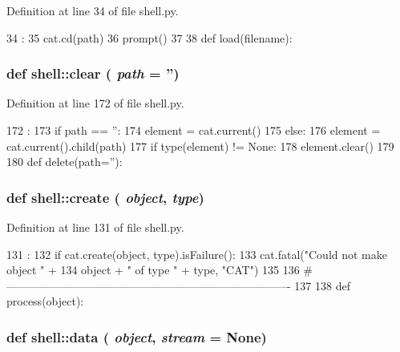 Definition at line 34 of file shell.py.


\begin{DoxyCode}
34                :
35   cat.cd(path)
36   prompt()
37 
38 
def load(filename):
\end{DoxyCode}
\hypertarget{namespaceshell_aeef375fe6412bd4da281ceaac2fad6b0}{
\subsubsection[{clear}]{\setlength{\rightskip}{0pt plus 5cm}def shell::clear ( {\em path} = {\ttfamily ''})}}
\label{namespaceshell_aeef375fe6412bd4da281ceaac2fad6b0}


Definition at line 172 of file shell.py.


\begin{DoxyCode}
172                   :
173   if path == '':
174     element = cat.current()
175   else:
176     element = cat.current().child(path)
177   if type(element) != None:
178     element.clear()
179 
180 
def delete(path=''):
\end{DoxyCode}
\hypertarget{namespaceshell_ac23ebd11b2ad5660ac161b24297dd2c2}{
\subsubsection[{create}]{\setlength{\rightskip}{0pt plus 5cm}def shell::create ( {\em object}, \/   {\em type})}}
\label{namespaceshell_ac23ebd11b2ad5660ac161b24297dd2c2}


Definition at line 131 of file shell.py.


\begin{DoxyCode}
131                         :
132   if cat.create(object, type).isFailure():
133     cat.fatal("Could not make object " +
134               object + " of type " + type, "CAT")
135 
136 #----------------------------------------------------------------------------
137 
138 
def process(object):
\end{DoxyCode}
\hypertarget{namespaceshell_a3c1788d69046b9e508b31e01b5cf71fc}{
\subsubsection[{data}]{\setlength{\rightskip}{0pt plus 5cm}def shell::data ( {\em object}, \/   {\em stream} = {\ttfamily None})}}
\label{namespaceshell_a3c1788d69046b9e508b31e01b5cf71fc}


